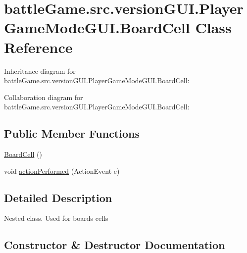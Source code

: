 \hypertarget{classbattleGame_1_1src_1_1versionGUI_1_1PlayerGameModeGUI_1_1BoardCell}{}\section{battle\+Game.\+src.\+version\+G\+U\+I.\+Player\+Game\+Mode\+G\+U\+I.\+Board\+Cell Class Reference}
\label{classbattleGame_1_1src_1_1versionGUI_1_1PlayerGameModeGUI_1_1BoardCell}


Inheritance diagram for battle\+Game.\+src.\+version\+G\+U\+I.\+Player\+Game\+Mode\+G\+U\+I.\+Board\+Cell\+:


Collaboration diagram for battle\+Game.\+src.\+version\+G\+U\+I.\+Player\+Game\+Mode\+G\+U\+I.\+Board\+Cell\+:
\subsection*{Public Member Functions}
\begin{DoxyCompactItemize}
\item 
\hyperlink{classbattleGame_1_1src_1_1versionGUI_1_1PlayerGameModeGUI_1_1BoardCell_afcc186591fef044466507e38f09aa534}{Board\+Cell} ()
\item 
void \hyperlink{classbattleGame_1_1src_1_1versionGUI_1_1PlayerGameModeGUI_1_1BoardCell_a1fa37441f3aad5d112a1c1fc8f16745f}{action\+Performed} (Action\+Event e)
\end{DoxyCompactItemize}


\subsection{Detailed Description}
Nested class. Used for board\textquotesingle{}s cells 

\subsection{Constructor \& Destructor Documentation}
